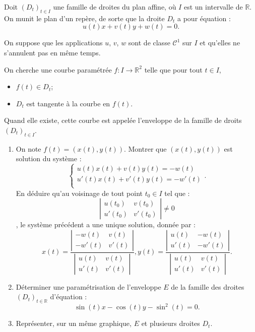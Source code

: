 \documentclass[10pt,fleqn]{article} %
\begin{document}
\begin{multicols}{2}
Doit $\left(D_t\right)_{t\in I}$ une famille de droites du plan affine, où $I$ est un intervalle de $\mathbb{R}$. On munit le plan d'un repère, de sorte que la droite $D_t$ a pour équation :
$$
u(t) x+v(t) y + w(t) = 0.
$$

On suppose que les applications $u$, $v$, $w$ sont de classe $\mathcal{C}^1$ sur $I$ et qu'elles ne s'annulent pas en même temps. 

On cherche une courbe paramétrée $f:I \to \mathbb{R}^2$ telle que pour tout $t\in I$, 
\begin{itemize}
\item $f(t)\in D_t$;
\item $D_t$ est tangente à la courbe en $f(t)$.
\end{itemize}
Quand elle existe, cette courbe est appelée l'enveloppe de la famille de droits $\left(D_t\right)_{t\in I}$. 
\begin{enumerate}
\item On note $f(t)=\left(x(t),y(t)\right)$. Montrer que $\left(x(t),y(t)\right)$ est solution du système :
$$
\left\{
\begin{array}{l}
u(t) x(t) + v(t) y(t)= -w(t) \\
u'(t) x(t) + v'(t) y(t)= -w'(t) \\
\end{array}
\right. .
$$
En déduire qu'au voisinage de tout point $t_0 \in I$ tel que :
$$
\left| 
\begin{array}{cc}
u(t_0) & v(t_0) \\
u'(t_0) & v'(t_0)
\end{array}
\right|
\neq 0
$$,
le système précédent a une unique solution, donnée par :
$$
x(t)=\dfrac{\left| 
\begin{array}{cc}
-w(t) & v(t) \\
-w'(t) & v'(t)
\end{array}
\right|
}{\left| 
\begin{array}{cc}
u(t) & v(t) \\
u'(t) & v'(t)
\end{array}
\right|},
y(t)=\dfrac{\left| 
\begin{array}{cc}
u(t) & -w(t) \\
u'(t) & -w'(t)
\end{array}
\right|
}{\left| 
\begin{array}{cc}
u(t) & v(t) \\
u'(t) & v'(t)
\end{array}
\right|}.
$$
\item Déterminer une paramétrisation de l'enveloppe $E$ de la famille des droites $\left(D_t\right)_{t\in \mathbb{R}}$ d'équation :
$$
\sin(t) x - \cos(t) y -\sin^2(t)=0.
$$
\item Représenter, sur un même graphique, $E$ et plusieurs droites $D_t$.
\end{enumerate}




\end{multicols}
\end{document}
